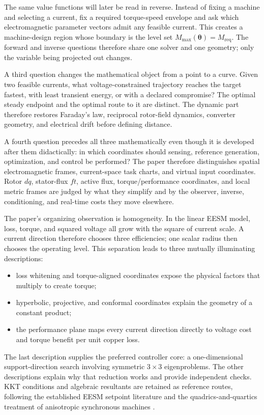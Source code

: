 The same value functions will later be read in reverse. Instead of fixing a
machine and selecting a current, fix a required torque-speed envelope and ask
which electromagnetic parameter vectors admit any feasible current. This
creates a machine-design region whose boundary is the level set
\(M_{\max}(\boldsymbol\theta)=M_{\mathrm{req}}\). The forward and inverse
questions therefore share one solver and one geometry; only the variable being
projected out changes.

A third question changes the mathematical object from a point to a curve.
Given two feasible currents, what voltage-constrained trajectory reaches the
target fastest, with least transient energy, or with a declared compromise?
The optimal steady endpoint and the optimal route to it are distinct. The
dynamic part therefore restores Faraday's law, reciprocal rotor-field
dynamics, converter geometry, and electrical drift before defining distance.

A fourth question precedes all three mathematically even though it is
developed after them didactically: in which coordinates should sensing,
reference generation, optimization, and control be performed? The paper
therefore distinguishes spatial electromagnetic frames, current-space task
charts, and virtual input coordinates. Rotor \(dq\), stator-flux \(ft\),
active flux, torque/performance coordinates, and local metric frames are
judged by what they simplify and by the observer, inverse, conditioning, and
real-time costs they move elsewhere.

The paper's organizing observation is homogeneity. In the linear EESM model,
loss, torque, and squared voltage all grow with the square of current scale.
A current direction therefore chooses three efficiencies; one scalar radius
then chooses the operating level. This separation leads to three mutually
illuminating descriptions:
\begin{itemize}
 \item loss whitening and torque-aligned coordinates expose the physical
       factors that multiply to create torque;
 \item hyperbolic, projective, and conformal coordinates explain the geometry
       of a constant product;
 \item the performance plane maps every current direction directly to voltage
       cost and torque benefit per unit copper loss.
\end{itemize}
The last description supplies the preferred controller core: a one-dimensional
support-direction search involving symmetric \(3\times3\) eigenproblems. The
other descriptions explain why that reduction works and provide independent
checks. KKT conditions and algebraic resultants are retained as reference
routes, following the established EESM setpoint literature
\cite{reinhard2022} and the quadrics-and-quartics treatment of anisotropic
synchronous machines \cite{eldeeb2018,eldeeb2016}.

